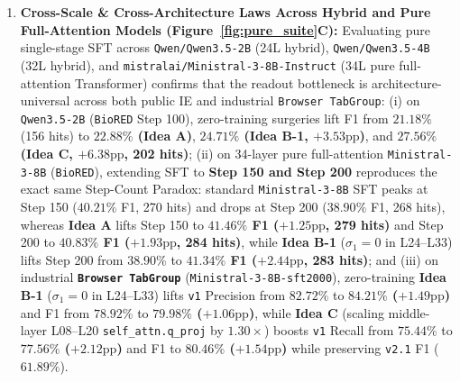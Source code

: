 \documentclass[11pt,a4paper]{article}
\begin{document}
\begin{enumerate}
    \item \textbf{Cross-Scale \& Cross-Architecture Laws Across Hybrid and Pure Full-Attention Models (Figure~\ref{fig:pure_suite}C):} Evaluating pure single-stage SFT across \texttt{Qwen/Qwen3.5-2B} (24L hybrid), \texttt{Qwen/Qwen3.5-4B} (32L hybrid), and \texttt{mistralai/Ministral-3-8B-Instruct} (34L pure full-attention Transformer) confirms that the readout bottleneck is architecture-universal across both public IE and industrial \texttt{Browser TabGroup}: (i) on \texttt{Qwen3.5-2B} (\texttt{BioRED} Step 100), zero-training surgeries lift F1 from $21.18\%$ (156 hits) to \textbf{$22.88\%$ (\textbf{Idea A})}, \textbf{$24.71\%$ (\textbf{Idea B-1}, $+3.53\text{pp}$)}, and \textbf{$27.56\%$ (\textbf{Idea C}, $+6.38\text{pp}$, 202 hits)}; (ii) on 34-layer pure full-attention \texttt{Ministral-3-8B} (\texttt{BioRED}), extending SFT to \textbf{Step 150 and Step 200} reproduces the exact same Step-Count Paradox: standard \texttt{Ministral-3-8B} SFT peaks at Step 150 ($40.21\%$ F1, 270 hits) and drops at Step 200 ($38.90\%$ F1, 268 hits), whereas \textbf{Idea A} lifts Step 150 to \textbf{$41.46\%$ F1 ($+1.25\text{pp}$, 279 hits)} and Step 200 to \textbf{$40.83\%$ F1 ($+1.93\text{pp}$, 284 hits)}, while \textbf{Idea B-1} ($\sigma_1=0$ in L24--L33) lifts Step 200 from $38.90\%$ to \textbf{$41.34\%$ F1 ($+2.44\text{pp}$, 283 hits)}; and (iii) on industrial \textbf{\texttt{Browser TabGroup}} (\texttt{Ministral-3-8B-sft2000}), zero-training \textbf{Idea B-1} ($\sigma_1=0$ in L24--L33) lifts \texttt{v1} Precision from $82.72\%$ to \textbf{$84.21\%$ ($+1.49\text{pp}$)} and F1 from $78.92\%$ to \textbf{$79.98\%$ ($+1.06\text{pp}$)}, while \textbf{Idea C} (scaling middle-layer L08--L20 \texttt{self\_attn.q\_proj} by $1.30\times$) boosts \texttt{v1} Recall from $75.44\%$ to \textbf{$77.56\%$ ($+2.12\text{pp}$)} and F1 to \textbf{$80.46\%$ ($+1.54\text{pp}$)} while preserving \texttt{v2.1} F1 ($61.89\%$).
\end{enumerate}
\end{document}
